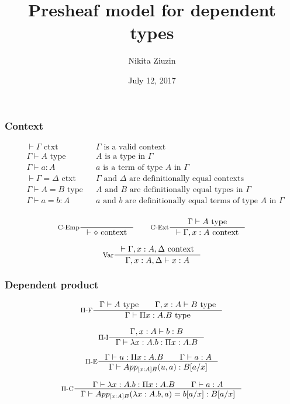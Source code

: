 \documentclass{beamer}
\title{Presheaf model for dependent types}
\author{Nikita Ziuzin}
\date{July 12, 2017}
\begin{document}
\frame{\titlepage}


\begin{frame}
  \frametitle{Context}

  \begin{align*}
    &\vdash \Gamma \text{ ctxt} &&\text{$\Gamma$ is a valid context}\\
    &\Gamma \vdash A \text{ type} &&\text{$A$ is a type in $\Gamma$}\\
    &\Gamma \vdash a : A &&\text{$a$ is a term of type $A$ in $\Gamma$}\\
    &\vdash \Gamma = \Delta \text{ ctxt}  &&\text{$\Gamma$ and $\Delta$ are definitionally equal contexts}\\
    &\Gamma \vdash A = B \text{ type}  &&\text{$A$ and $B$ are definitionally equal types in $\Gamma$}\\
    &\Gamma \vdash a = b : A  &&\text{$a$ and $b$ are definitionally equal terms of type $A$ in $\Gamma$}\\
  \end{align*}

  \[
    \inference[C-Emp]{}{\vdash \diamond \text{ context}}
    \qquad
    \inference[C-Ext]{\Gamma \vdash A \text{ type}}{\vdash \Gamma, x:A \text{ context}}
  \]

  \[
    \inference[Var]{\vdash \Gamma, x:A, \Delta \text{ context}}{\Gamma, x:A, \Delta \vdash x:A}
  \]
\end{frame}

\begin{frame}
  \frametitle{Dependent product}

  \[
    \inference[$\Pi$-F]{\Gamma \vdash A \text{ type} \qquad \Gamma, x:A \vdash B \text{ type}}{\Gamma \vdash \Pi x:A. B \text{ type}}
  \]

  \[
    \inference[$\Pi$-I]{\Gamma, x:A \vdash b : B}{\Gamma \vdash \lambda x : A. b : \Pi x:A. B}
  \]

  \[
    \inference[$\Pi$-E]{\Gamma \vdash u : \Pi x:A. B \qquad \Gamma \vdash a : A}
      {\Gamma \vdash App_{[x:A]B}(u, a): B[a / x]}
  \]

  \[
    \inference[$\Pi$-C]{\Gamma \vdash \lambda x : A. b : \Pi x:A. B \qquad \Gamma \vdash a : A}
      {\Gamma \vdash App_{[x:A]B}(\lambda x : A. b, a) = b[a / x]: B [a / x]}
  \]

\end{frame}
\end{document}
